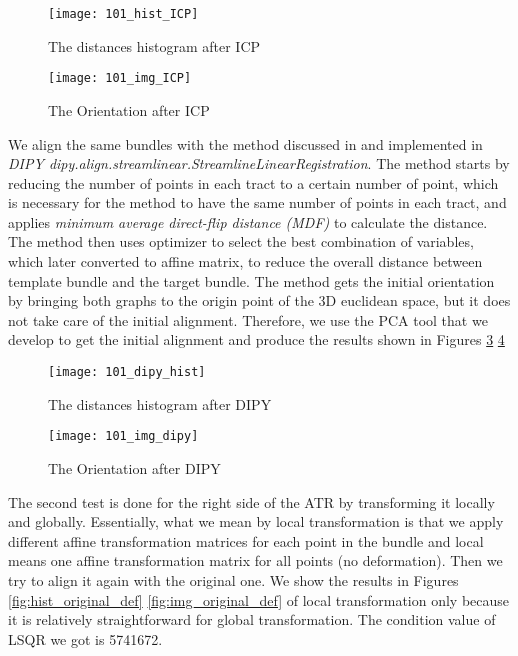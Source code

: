 \documentclass[../structure.tex]{subfiles}
\begin{document}
\begin{figure}[h!]
\centering
\texttt{[image: 101\_hist\_ICP]}
\captionsetup{justification=centering}
\caption{The distances histogram after ICP}
\label{fig:hist_ICP}
\end{figure}

\begin{figure}[h!]
\centering
\texttt{[image: 101\_img\_ICP]}
\captionsetup{justification=centering}
\caption{The Orientation after ICP}
\label{fig:img_ICP}
\end{figure}
\pagebreak
We align the same bundles with the method discussed in \cite{Garyfallidis2012} and implemented in \textit{DIPY dipy.align.streamlinear.StreamlineLinearRegistration}. The method starts by reducing the number of points in each tract to a certain number of point, which is necessary for the method to have the same number of points in each tract, and applies \textit{minimum average direct-flip distance (MDF)} to calculate the distance. The method then uses optimizer to select the best combination of variables, which later converted to affine matrix, to reduce the overall distance between template bundle and the target bundle. The method gets the initial orientation by bringing both graphs to the origin point of the 3D euclidean space, but it does not take care of the initial alignment. Therefore, we use the PCA tool that we develop to get the initial alignment and produce the results shown in Figures \ref{fig:dipy_hist} \ref{fig:img_dipy}

\begin{figure}[h!]
\centering
\texttt{[image: 101\_dipy\_hist]}
\captionsetup{justification=centering}
\caption{The distances histogram after DIPY}
\label{fig:dipy_hist}
\end{figure}

\begin{figure}[h!]
\centering
\texttt{[image: 101\_img\_dipy]}
\captionsetup{justification=centering}
\caption{The Orientation after DIPY}
\label{fig:img_dipy}
\end{figure}
\pagebreak

The second test is done for the right side of the ATR by transforming it locally and globally. Essentially, what we mean by local transformation is that we apply different affine transformation matrices for each point in the bundle and local means one affine transformation matrix for all points (no deformation). Then we try to align it again with the original one. We show the results in Figures \ref{fig:hist_original_def} \ref{fig:img_original_def} of local transformation only because it is relatively straightforward for global transformation. The condition value of LSQR we got is 5741672.
\end{document}
